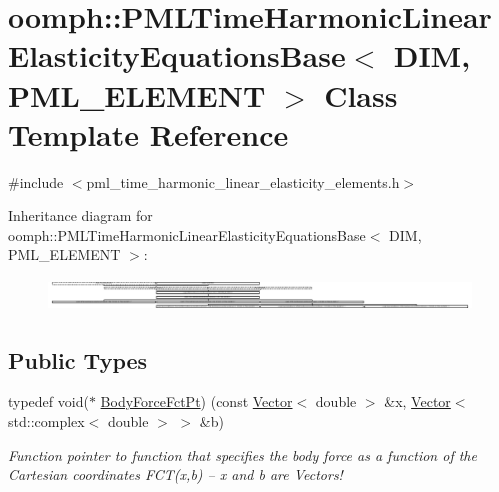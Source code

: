 \hypertarget{classoomph_1_1PMLTimeHarmonicLinearElasticityEquationsBase}{}\section{oomph\+:\+:P\+M\+L\+Time\+Harmonic\+Linear\+Elasticity\+Equations\+Base$<$ D\+IM, P\+M\+L\+\_\+\+E\+L\+E\+M\+E\+NT $>$ Class Template Reference}
\label{classoomph_1_1PMLTimeHarmonicLinearElasticityEquationsBase}


{\ttfamily \#include $<$pml\+\_\+time\+\_\+harmonic\+\_\+linear\+\_\+elasticity\+\_\+elements.\+h$>$}

Inheritance diagram for oomph\+:\+:P\+M\+L\+Time\+Harmonic\+Linear\+Elasticity\+Equations\+Base$<$ D\+IM, P\+M\+L\+\_\+\+E\+L\+E\+M\+E\+NT $>$\+:\begin{figure}[H]
\begin{center}
\leavevmode
\includegraphics[height=0.862423cm]{classoomph_1_1PMLTimeHarmonicLinearElasticityEquationsBase}
\end{center}
\end{figure}
\subsection*{Public Types}
\begin{DoxyCompactItemize}
\item 
typedef void($\ast$ \hyperlink{classoomph_1_1PMLTimeHarmonicLinearElasticityEquationsBase_a04218d2a825726c0cd6b975d1ecd2f12}{Body\+Force\+Fct\+Pt}) (const \hyperlink{classoomph_1_1Vector}{Vector}$<$ double $>$ \&x, \hyperlink{classoomph_1_1Vector}{Vector}$<$ std\+::complex$<$ double $>$ $>$ \&b)
\begin{DoxyCompactList}\small\item\em Function pointer to function that specifies the body force as a function of the Cartesian coordinates F\+C\+T(x,b) -- x and b are Vectors! \end{DoxyCompactList}\end{DoxyCompactItemize}
